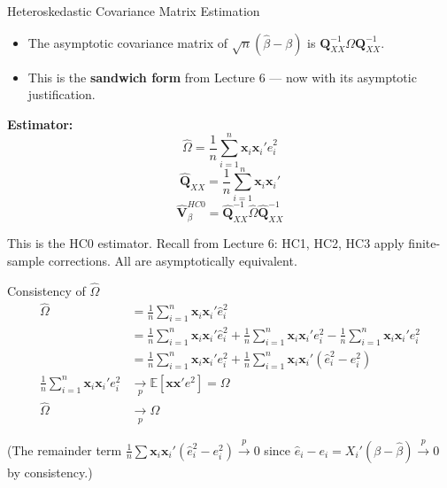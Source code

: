\documentclass[aspectratio=169, handout, t]{beamer}
\numberwithin{equation}{section}
\begin{document}

\begin{frame}{Heteroskedastic Covariance Matrix Estimation}
\begin{itemize}
\item The asymptotic covariance matrix of $\sqrt{n}(\hat{\beta}-\beta)$ is $\bm{Q}_{XX}^{-1} \Omega \bm{Q}_{XX}^{-1}$.
\item This is the \textbf{sandwich form} from Lecture 6 --- now with its asymptotic justification.
\end{itemize}

\pause

\textbf{Estimator:}
$$\hat{\Omega}=\frac{1}{n}\sum_{i=1}^n \bm{x}_i\bm{x}_i'\hat{e}_i^2$$
$$\hat{\bm{Q}}_{XX}=\frac{1}{n}\sum_{i=1}^n\bm{x}_i\bm{x}_i'$$
$$\hat{\bm{V}}_\beta^{HC0}=\hat{\bm{Q}}_{XX}^{-1} \hat{\Omega} \hat{\bm{Q}}_{XX}^{-1}$$

\pause

This is the HC0 estimator. Recall from Lecture 6: HC1, HC2, HC3 apply finite-sample corrections. All are asymptotically equivalent.
\end{frame}


\begin{frame}{Consistency of $\hat{\Omega}$}
\begin{align*}
\hat{\Omega}&=\frac{1}{n}\sum_{i=1}^n \bm{x}_i\bm{x}_i'\hat{e}_i^2\\
&=\frac{1}{n}\sum_{i=1}^n \bm{x}_i\bm{x}_i'\hat{e}_i^2+\frac{1}{n}\sum_{i=1}^n \bm{x}_i\bm{x}_i'e_i^2-\frac{1}{n}\sum_{i=1}^n \bm{x}_i\bm{x}_i'e_i^2\\
&=\frac{1}{n}\sum_{i=1}^n \bm{x}_i\bm{x}_i'e_i^2+\frac{1}{n}\sum_{i=1}^n \bm{x}_i\bm{x}_i'(\hat{e}_i^2-e_i^2)\\
\frac{1}{n}\sum_{i=1}^n \bm{x}_i\bm{x}_i'e_i^2&\underset{p}{\to}\mathbb{E}[\bm{x}\bm{x}'e^2]=\Omega \tag{WLLN}\\
\hat{\Omega}&\underset{p}{\to}\Omega
\end{align*}

\pause

(The remainder term $\frac{1}{n}\sum \bm{x}_i\bm{x}_i'(\hat{e}_i^2-e_i^2) \overset{p}{\to} 0$ since $\hat{e}_i - e_i = X_i'(\beta - \hat\beta) \overset{p}{\to} 0$ by consistency.)

\end{frame}

\end{document}
